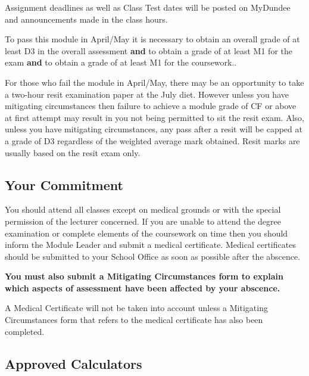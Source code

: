 \documentclass [11pt]{article}
\begin{document}
\vspace*{-0.7cm}

Assignment deadlines as well as Class Test dates will be posted on MyDundee
and announcements made in the class hours.

\medskip


To pass this module in April/May it is necessary to obtain an overall grade of at least D3 in 
the overall assessment 
\textbf{and} to obtain a grade of at least M1 for the exam {\bf and} to obtain a grade
of at least M1 for the coursework.. 

For those who fail the module in April/May, there may be an opportunity to take a two-hour resit examination paper at the July diet. However unless you have mitigating circumstances then failure to achieve a module grade of CF or above at first attempt may result in you not being permitted to sit the resit exam. Also, unless you have mitigating circumstances, any pass after a resit will be capped at a grade of D3 regardless of the weighted average mark obtained. Resit marks are usually based on the resit exam only. 
\medskip




\subsection*{Your Commitment}

You should attend all classes  except on medical grounds 
or with the special permission of the lecturer concerned.   If you are unable
to attend the degree examination or complete elements of the coursework on time 
then you should inform the Module Leader and submit a medical certificate. Medical certificates should be 
submitted to your School Office as soon as possible after the abscence.

{\bf You must also  submit a Mitigating Circumstances form to explain which aspects of assessment have been affected by your abscence.}

A Medical Certificate will not be taken into account unless 
a Mitigating Circumstances form that refers to the medical certificate has also been completed.

\subsection*{Approved Calculators}
\end{document}
